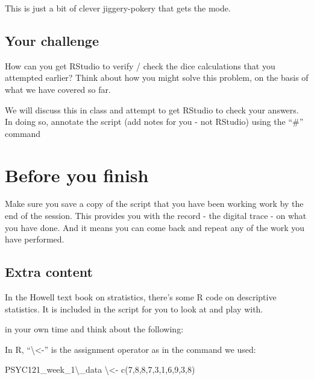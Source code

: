\documentclass[
]{book}
\newenvironment{Shaded}{\begin{snugshade}}{\end{snugshade}}
\newcommand{\DecValTok}[1]{\textcolor[rgb]{0.00,0.00,0.81}{#1}}
\newcommand{\FunctionTok}[1]{\textcolor[rgb]{0.00,0.00,0.00}{#1}}
\newcommand{\NormalTok}[1]{#1}
\newcommand{\OtherTok}[1]{\textcolor[rgb]{0.56,0.35,0.01}{#1}}
\begin{document}
This is just a bit of clever jiggery-pokery that gets the mode.

\hypertarget{your-challenge}{%
\subsection{Your challenge}\label{your-challenge}}

How can you get RStudio to verify / check the dice calculations that you attempted earlier? Think about how you might solve this problem, on the basis of what we have covered so far.

We will discuss this in class and attempt to get RStudio to check your answers. In doing so, annotate the script (add notes for you - not RStudio) using the ``\#'' command

\hypertarget{before-you-finish}{%
\section{Before you finish}\label{before-you-finish}}

Make sure you save a copy of the script that you have been working work by the end of the session. This provides you with the record - the digital trace - on what you have done. And it means you can come back and repeat any of the work you have performed.

\hypertarget{extra-content}{%
\subsection{Extra content}\label{extra-content}}

In the Howell text book on stratistics, there's some R code on descriptive statistics. It is included in the script for you to look at and play with.

in your own time and think about the following:

In R, ``\textbackslash\textless-'' is the assignment operator as in the command we used:

\begin{Shaded}
\begin{Highlighting}[]
\NormalTok{PSYC121\_week\_1\textbackslash{}\_data \textbackslash{}}\OtherTok{\textless{}{-}} \FunctionTok{c}\NormalTok{(}\DecValTok{7}\NormalTok{,}\DecValTok{8}\NormalTok{,}\DecValTok{8}\NormalTok{,}\DecValTok{7}\NormalTok{,}\DecValTok{3}\NormalTok{,}\DecValTok{1}\NormalTok{,}\DecValTok{6}\NormalTok{,}\DecValTok{9}\NormalTok{,}\DecValTok{3}\NormalTok{,}\DecValTok{8}\NormalTok{)}
\end{Highlighting}
\end{Shaded}
\end{document}
